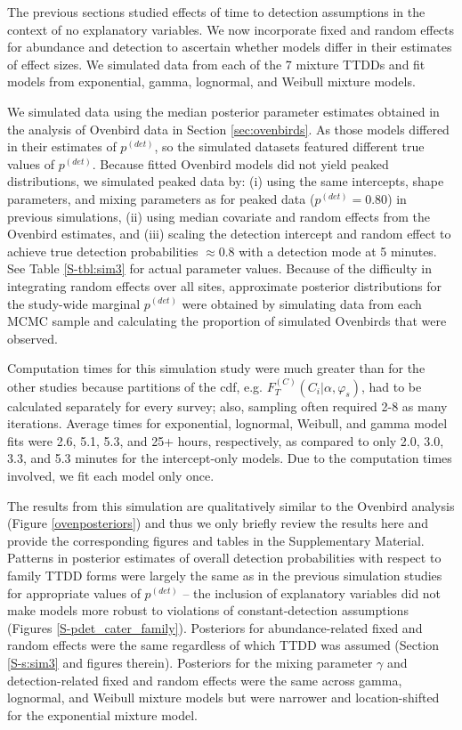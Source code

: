 \documentclass[12pt]{article}
\newcommand{\pdet}{p^{(det)}}
\newcommand{\Fm}{F_T^{(C)}}
\begin{document}
The previous sections studied effects of time to detection assumptions in the context of no explanatory variables.
We now incorporate fixed and random effects for abundance and detection to ascertain whether models differ in their estimates of effect sizes.
We simulated data from each of the 7 mixture TTDDs and fit models from exponential, gamma, lognormal, and Weibull mixture models.  

We simulated data using the median posterior parameter estimates obtained in the analysis of Ovenbird data in Section \ref{sec:ovenbirds}.
As those models differed in their estimates of $\pdet$, so the simulated datasets featured different true values of $\pdet$.
Because fitted Ovenbird models did not yield peaked distributions, we simulated peaked data by: (i) using the same intercepts, shape parameters, and mixing parameters as for peaked data ($\pdet = 0.80$) in previous simulations, (ii) using median covariate and random effects from the Ovenbird estimates, and (iii) scaling the detection intercept and random effect to achieve true detection probabilities $\approx 0.8$ with a detection mode at 5 minutes.
See Table \ref{S-tbl:sim3} for actual parameter values.
Because of the difficulty in integrating random effects over all sites, approximate posterior distributions for the study-wide marginal $\pdet$ were obtained by simulating data from each MCMC sample and calculating the proportion of simulated Ovenbirds that were observed.

Computation times for this simulation study were much greater than for the other studies because partitions of the cdf, e.g. $\Fm(C_i|\alpha,\varphi_s)$, had to be calculated separately for every survey; also, sampling often required 2-8 as many iterations.
Average times for exponential, lognormal, Weibull, and gamma model fits were 2.6, 5.1, 5.3, and 25+ hours, respectively, as compared to only 2.0, 3.0, 3.3, and 5.3 minutes for the intercept-only models.
Due to the computation times involved, we fit each model only once.

The results from this simulation are qualitatively similar to the Ovenbird analysis (Figure \ref{ovenposteriors}) and thus we only briefly review the results here and provide the corresponding figures and tables in the Supplementary Material. 
Patterns in posterior estimates of overall detection probabilities with respect to family TTDD forms were largely the same as in the previous simulation studies for appropriate values of $\pdet$ -- the inclusion of explanatory variables did not make models more robust to violations of constant-detection assumptions (Figures \ref{S-pdet_cater_family}).  
Posteriors for abundance-related fixed and random effects were the same regardless of which TTDD was assumed (Section \ref{S-s:sim3} and figures therein).  
Posteriors for the mixing parameter $\gamma$ and detection-related fixed and random effects were the same across gamma, lognormal, and Weibull mixture models but were narrower and location-shifted for the exponential mixture model.  
\end{document}
